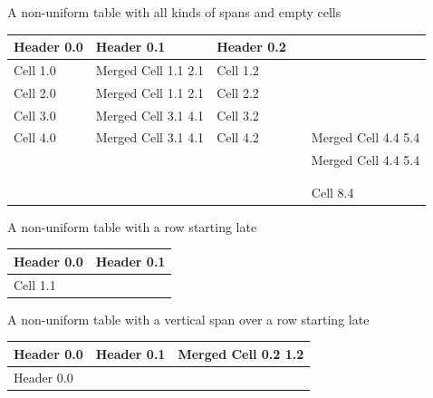 \documentclass[11pt,a4paper]{article}
\begin{document}
A non-uniform table with all kinds of spans and empty cells

\begin{table}[h]
\begin{tabular}{|l|l|l|l|l|}
\hline
Header 0.0 & Header 0.1 & Header 0.2 &  &  \\ \hline
Cell 1.0 & Merged Cell 1.1 2.1 & Cell 1.2 &  &  \\ \hline
Cell 2.0 & Merged Cell 1.1 2.1 & Cell 2.2 &  &  \\ \hline
Cell 3.0 & Merged Cell 3.1 4.1 & Cell 3.2 &  &  \\ \hline
Cell 4.0 & Merged Cell 3.1 4.1 & Cell 4.2 &  & Merged Cell 4.4 5.4 \\ \hline
 &  &  &  & Merged Cell 4.4 5.4 \\ \hline
 &  &  &  &  \\ \hline
 &  &  &  &  \\ \hline
 &  &  &  & Cell 8.4 \\ \hline
\end{tabular}
\end{table}

A non-uniform table with a row starting late

\begin{table}[h]
\begin{tabular}{|l|l|}
\hline
Header 0.0 & Header 0.1 \\ \hline
Cell 1.1 &  \\ \hline
\end{tabular}
\end{table}

A non-uniform table with a vertical span over a row starting late

\begin{table}[h]
\begin{tabular}{|l|l|l|}
\hline
Header 0.0 & Header 0.1 & Merged Cell 0.2 1.2 \\ \hline
Header 0.0 &  &  \\ \hline
\end{tabular}
\end{table}
\end{document}
